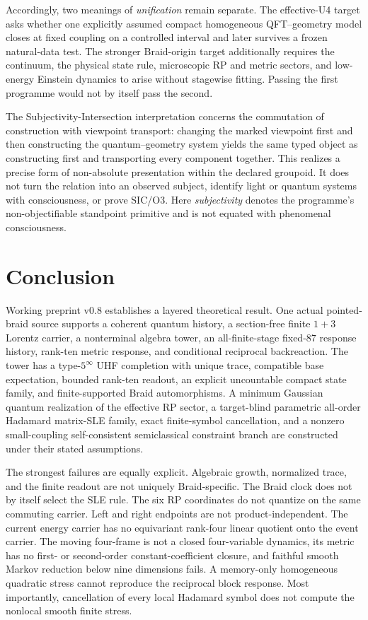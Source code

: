 \documentclass[11pt]{article}
\theoremstyle{definition}
\theoremstyle{remark}
\begin{document}
Accordingly, two meanings of \emph{unification} remain separate. The effective-U4 target asks whether one explicitly assumed compact homogeneous QFT--geometry model closes at fixed coupling on a controlled interval and later survives a frozen natural-data test. The stronger Braid-origin target additionally requires the continuum, the physical state rule, microscopic RP and metric sectors, and low-energy Einstein dynamics to arise without stagewise fitting. Passing the first programme would not by itself pass the second.

The Subjectivity-Intersection interpretation concerns the commutation of construction with viewpoint transport: changing the marked viewpoint first and then constructing the quantum--geometry system yields the same typed object as constructing first and transporting every component together. This realizes a precise form of non-absolute presentation within the declared groupoid. It does not turn the relation into an observed subject, identify light or quantum systems with consciousness, or prove SIC/O3. Here \emph{subjectivity} denotes the programme's non-objectifiable standpoint primitive and is not equated with phenomenal consciousness.

\section{Conclusion}

Working preprint v0.8 establishes a layered theoretical result. One actual pointed-braid source supports a coherent quantum history, a section-free finite $1+3$ Lorentz carrier, a nonterminal algebra tower, an all-finite-stage fixed-$87$ response history, rank-ten metric response, and conditional reciprocal backreaction. The tower has a type-$5^\infty$ UHF completion with unique trace, compatible base expectation, bounded rank-ten readout, an explicit uncountable compact state family, and finite-supported Braid automorphisms. A minimum Gaussian quantum realization of the effective RP sector, a target-blind parametric all-order Hadamard matrix-SLE family, exact finite-symbol cancellation, and a nonzero small-coupling self-consistent semiclassical constraint branch are constructed under their stated assumptions.

The strongest failures are equally explicit. Algebraic growth, normalized trace, and the finite readout are not uniquely Braid-specific. The Braid clock does not by itself select the SLE rule. The six RP coordinates do not quantize on the same commuting carrier. Left and right endpoints are not product-independent. The current energy carrier has no equivariant rank-four linear quotient onto the event carrier. The moving four-frame is not a closed four-variable dynamics, its metric has no first- or second-order constant-coefficient closure, and faithful smooth Markov reduction below nine dimensions fails. A memory-only homogeneous quadratic stress cannot reproduce the reciprocal block response. Most importantly, cancellation of every local Hadamard symbol does not compute the nonlocal smooth finite stress.
\end{document}
